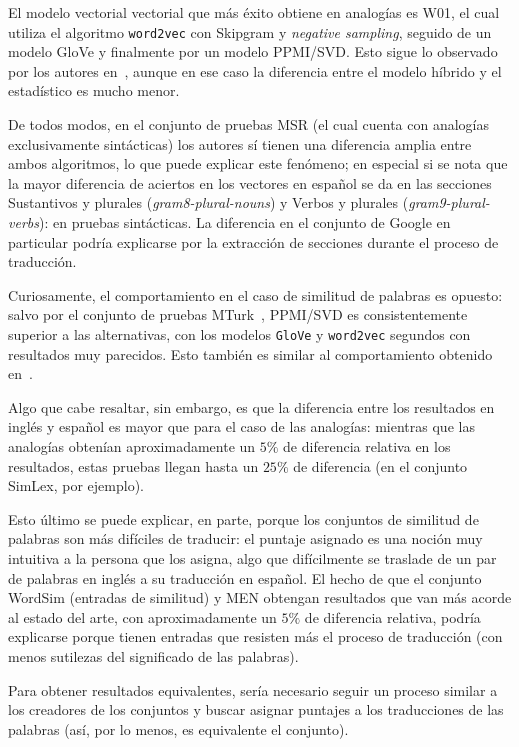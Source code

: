El modelo vectorial vectorial que más éxito obtiene en analogías es W01, el cual utiliza el
algoritmo \texttt{word2vec} con Skipgram y \textit{negative sampling}, seguido de un modelo GloVe y
finalmente por un modelo PPMI/SVD\@. Esto sigue lo observado por los autores en~\cite{Levy2015},
aunque en ese caso la diferencia entre el modelo híbrido y el estadístico es mucho menor.

De todos modos, en el conjunto de pruebas MSR (el cual cuenta con analogías exclusivamente
sintácticas) los autores sí tienen una diferencia amplia entre ambos algoritmos, lo que puede
explicar este fenómeno; en especial si se nota que la mayor diferencia de aciertos en los vectores
en español se da en las secciones Sustantivos y plurales (\textit{gram8-plural-nouns}) y Verbos y
plurales (\textit{gram9-plural-verbs}): en pruebas sintácticas. La diferencia en el conjunto de Google
en particular podría explicarse por la extracción de secciones durante el proceso de traducción.

Curiosamente, el comportamiento en el caso de similitud de palabras es opuesto: salvo por el
conjunto de pruebas MTurk~\cite{Radinsky2011}, PPMI/SVD es consistentemente superior a las alternativas,
con los modelos \texttt{GloVe} y \texttt{word2vec} segundos con resultados muy parecidos. Esto también
es similar al comportamiento obtenido en~\cite{Levy2015}.

Algo que cabe resaltar, sin embargo, es que la diferencia entre los resultados en inglés y español
es mayor que para el caso de las analogías: mientras que las analogías obtenían aproximadamente un
$5\%$ de diferencia relativa en los resultados, estas pruebas llegan hasta un $25\%$ de diferencia
(en el conjunto SimLex, por ejemplo).

Esto último se puede explicar, en parte, porque los conjuntos de similitud de palabras son más
difíciles de traducir: el puntaje asignado es una noción muy intuitiva a la persona que los asigna,
algo que difícilmente se traslade de un par de palabras en inglés a su traducción en español. El
hecho de que el conjunto WordSim (entradas de similitud) y MEN obtengan resultados que van más
acorde al estado del arte, con aproximadamente un $5\%$ de diferencia relativa, podría explicarse
porque tienen entradas que resisten más el proceso de traducción (con menos sutilezas del
significado de las palabras).

Para obtener resultados equivalentes, sería necesario seguir un proceso similar a los creadores de
los conjuntos y buscar asignar puntajes a los traducciones de las palabras (así, por lo menos, es
equivalente el conjunto).

